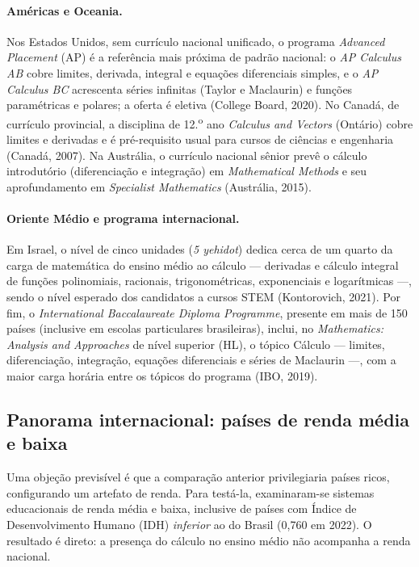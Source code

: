 \documentclass[12pt,a4paper,oneside]{article}
\begin{document}
\paragraph{Américas e Oceania.} Nos Estados Unidos, sem currículo
nacional unificado, o programa \emph{Advanced Placement} (AP) é a
referência mais próxima de padrão nacional: o \emph{AP Calculus AB} cobre
limites, derivada, integral e equações diferenciais simples, e o \emph{AP
Calculus BC} acrescenta séries infinitas (Taylor e Maclaurin) e funções
paramétricas e polares; a oferta é eletiva (College Board, 2020). No
Canadá, de currículo provincial, a disciplina de 12.\textsuperscript{o}
ano \emph{Calculus and Vectors} (Ontário) cobre limites e derivadas e é
pré-requisito usual para cursos de ciências e engenharia (Canadá, 2007).
Na Austrália, o currículo nacional sênior prevê o cálculo introdutório
(diferenciação e integração) em \emph{Mathematical Methods} e seu
aprofundamento em \emph{Specialist Mathematics} (Austrália, 2015).

\paragraph{Oriente Médio e programa internacional.} Em Israel, o nível de
cinco unidades (\emph{5 yehidot}) dedica cerca de um quarto da carga de
matemática do ensino médio ao cálculo --- derivadas e cálculo integral de
funções polinomiais, racionais, trigonométricas, exponenciais e
logarítmicas ---, sendo o nível esperado dos candidatos a cursos STEM
(Kontorovich, 2021). Por fim, o \emph{International Baccalaureate Diploma
Programme}, presente em mais de 150 países (inclusive em escolas
particulares brasileiras), inclui, no \emph{Mathematics: Analysis and
Approaches} de nível superior (HL), o tópico Cálculo --- limites,
diferenciação, integração, equações diferenciais e séries de Maclaurin
---, com a maior carga horária entre os tópicos do programa (IBO, 2019).

\subsection{Panorama internacional: países de renda média e baixa}
\label{sec:desenvolvimento}

Uma objeção previsível é que a comparação anterior privilegiaria países
ricos, configurando um artefato de renda. Para testá-la, examinaram-se
sistemas educacionais de renda média e baixa, inclusive de países com
Índice de Desenvolvimento Humano (IDH) \emph{inferior} ao do Brasil
(0,760 em 2022). O resultado é direto: a presença do cálculo no ensino
médio não acompanha a renda nacional.
\end{document}
